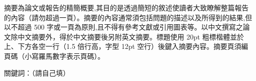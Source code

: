 \begin{ZhAbstract}

    \begin{ZhAbstractDescription}
        摘要為論文或報告的精簡概要,其目的是透過簡短的敘述使讀者大致瞭解整篇報告的內容（請勿超過一頁）。摘要的內容通常須包括問題的描述以及所得到的結果,但以不超過 500 字或一頁為原則,且不得有參考文獻或引用圖表等。以中文撰寫之論文除中文摘要外，得於中文摘要後另附英文摘要。標題使用 20pt 粗標楷體並於上、下方各空一行（1.5 倍行高，字型 12pt 空行）後鍵入摘要內容。摘要頁須編頁碼（小寫羅馬數字表示頁碼）。
    \end{ZhAbstractDescription}

    \begin{ZhAbstractItems}
    \noindent \text 關鍵詞：（請自己填）

    \end{ZhAbstractItems}
    
\end{ZhAbstract}

